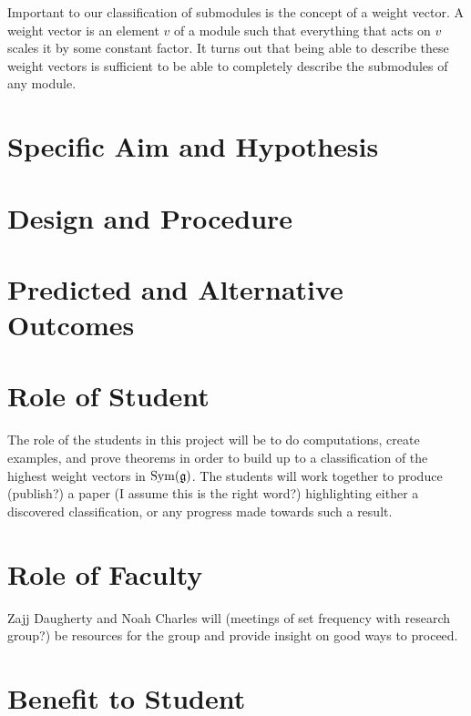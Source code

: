 Important to our classification of submodules is the concept of a weight vector.
A weight vector is an element $v$ of a module such that everything that acts on
$v$ scales it by some constant factor. It turns out that being able to describe
these weight vectors is sufficient to be able to completely describe the
submodules of any module.


\section{Specific Aim and Hypothesis}


\section{Design and Procedure}

\section{Predicted and Alternative Outcomes}

\section{Role of Student}

The role of the students in this project will be to do computations, create examples, and prove theorems in order to build up to a classification of the highest weight vectors in $\operatorname{Sym}(\mathfrak{g})$. The students will work together to produce (publish?) a paper (I assume this is the right word?) highlighting either a discovered classification, or any progress made towards such a result.

\section{Role of Faculty}

Zajj Daugherty and Noah Charles will (meetings of set frequency with research group?) be resources for the group and provide insight on good ways to proceed. %

\section{Benefit to Student}


\printbibliography{}


